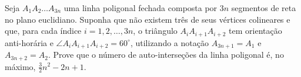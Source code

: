 Seja \(A_{1}A_{2} \dots A_{3n}\) uma linha poligonal fechada composta por \(3n\) segmentos de reta no plano euclidiano. Suponha que não existem três de seus vértices colineares e que, para cada índice \(i=1,2,\dots,3n\), o triângulo \(A_{i}A_{i+1}A_{i+2}\) tem orientação anti-horária e \(\angle A_{i}A_{i+1}A_{i+2} = 60^\circ\), utilizando a notação \(A_{3n+1} = A_{1}\) e \(A_{3n+2} = A_{2}\). Prove que o número de auto-interseções da linha poligonal é, no máximo, \(\frac{3}{2}n^{2} - 2n + 1\).
